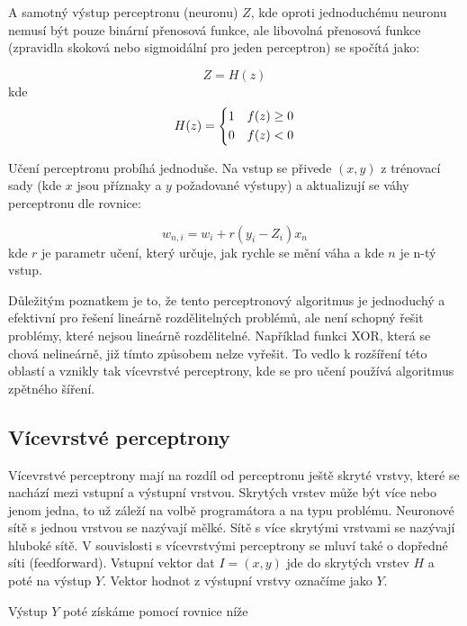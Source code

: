 \documentclass[FM,BP,fonts]{tulthesis}
\begin{document}
A samotný výstup perceptronu (neuronu) $Z$, kde oproti jednoduchému neuronu nemusí být pouze binární přenosová funkce, ale libovolná přenosová funkce (zpravidla skoková nebo sigmoidální pro jeden perceptron) \cite{martinpilatNN} se spočítá jako:

\begin{equation}
	Z = H(z)
\end{equation}
kde
\begin{equation}
	H(z) = \begin{dcases}
		1 & f(z) \geq 0 \\
		0 & f(z) < 0
	\end{dcases}
\end{equation}

Učení perceptronu probíhá jednoduše. Na vstup se přivede $(x,y)$ z trénovací sady (kde $x$ jsou příznaky a $y$ požadované výstupy) a aktualizují se váhy perceptronu dle rovnice:

\begin{equation}\label{eq:learning_percep}
	w_{n,i} = w_i + r(y_i-Z_i)x_n
\end{equation}
kde $r$ je parametr učení, který určuje, jak rychle se mění váha a kde $n$ je n-tý vstup.  

Důležitým poznatkem je to, že tento perceptronový algoritmus je jednoduchý a efektivní pro řešení lineárně rozdělitelných problémů, ale není schopný řešit problémy, které nejsou lineárně rozdělitelné. Například funkci XOR, která se chová nelineárně, již tímto způsobem nelze vyřešit. To vedlo k rozšíření této oblastí a vznikly tak vícevrstvé perceptrony, kde se pro učení používá algoritmus zpětného šíření.




\subsection{Vícevrstvé perceptrony}
Vícevrstvé perceptrony mají na rozdíl od perceptronu ještě skryté vrstvy, které se nachází mezi vstupní a výstupní vrstvou. Skrytých vrstev může být více nebo jenom jedna, to už záleží na volbě programátora a na typu problému. Neuronové sítě s jednou vrstvou se nazývají mělké. Sítě s více skrytými vrstvami se nazývají hluboké sítě. V souvislosti s vícevrstvými perceptrony se mluví také o dopředné síti (feedforward). Vstupní vektor dat $I = (x,y)$ jde do skrytých vrstev $H$ a poté na výstup $Y$. Vektor hodnot z výstupní vrstvy označíme jako $Y$. 

\newpage
Výstup $Y$ poté získáme pomocí rovnice níže 
\end{document}
